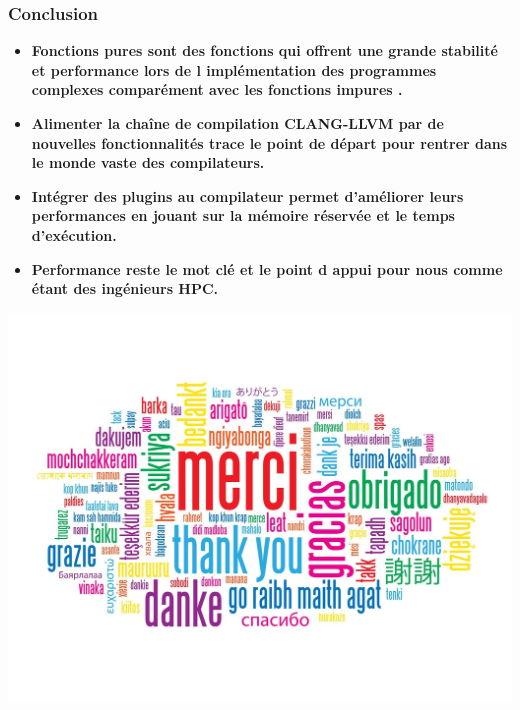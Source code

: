 \documentclass[hyperref={bookmarks=false},aspectratio=169]{beamer}
\begin{document}
\begin{frame}
\frametitle{Conclusion}

\begin{itemize}
 \item \textbf{Fonctions pures sont des fonctions qui offrent une grande stabilité et performance lors de l implémentation des programmes complexes comparément avec les fonctions impures .}
\item\textbf{Alimenter la chaîne de compilation CLANG-LLVM par de nouvelles fonctionnalités trace  le  point de départ pour rentrer dans le monde vaste des compilateurs. 
}
\item\textbf{Intégrer des plugins au compilateur  permet  d'améliorer leurs performances en jouant sur la mémoire réservée et le temps d'exécution.}
\item \textbf{Performance reste le mot clé  et le point d appui pour nous comme étant des ingénieurs HPC.
}
\end{itemize}


\end{frame}
\begin{frame}

\vfill
\begin{center} \includegraphics[scale=0.7]{./figures/danke.jpg} \end{center}
\vfill

\end{frame}

\end{document}
